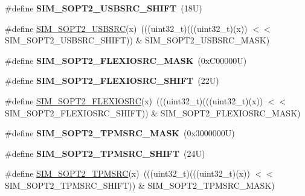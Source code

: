 \begin{DoxyCompactItemize}
\#define {\bfseries S\+I\+M\+\_\+\+S\+O\+P\+T2\+\_\+\+U\+S\+B\+S\+R\+C\+\_\+\+S\+H\+I\+FT}~(18\+U)
\item 
\#define \mbox{\hyperlink{group___s_i_m___register___masks_ga78428c831f0263054ac91c55ed89c016}{S\+I\+M\+\_\+\+S\+O\+P\+T2\+\_\+\+U\+S\+B\+S\+RC}}(x)~(((uint32\+\_\+t)(((uint32\+\_\+t)(x)) $<$$<$ S\+I\+M\+\_\+\+S\+O\+P\+T2\+\_\+\+U\+S\+B\+S\+R\+C\+\_\+\+S\+H\+I\+FT)) \& S\+I\+M\+\_\+\+S\+O\+P\+T2\+\_\+\+U\+S\+B\+S\+R\+C\+\_\+\+M\+A\+SK)
\item 
\mbox{\label{group___s_i_m___register___masks_ga3edd04c495fb49af9ba966854978234a}} 
\#define {\bfseries S\+I\+M\+\_\+\+S\+O\+P\+T2\+\_\+\+F\+L\+E\+X\+I\+O\+S\+R\+C\+\_\+\+M\+A\+SK}~(0x\+C00000\+U)
\item 
\mbox{\label{group___s_i_m___register___masks_ga2969322b1907bf7c3923734bacda7cf6}} 
\#define {\bfseries S\+I\+M\+\_\+\+S\+O\+P\+T2\+\_\+\+F\+L\+E\+X\+I\+O\+S\+R\+C\+\_\+\+S\+H\+I\+FT}~(22\+U)
\item 
\#define \mbox{\hyperlink{group___s_i_m___register___masks_ga4ab3fc6ac8e503f72388a3044914e04e}{S\+I\+M\+\_\+\+S\+O\+P\+T2\+\_\+\+F\+L\+E\+X\+I\+O\+S\+RC}}(x)~(((uint32\+\_\+t)(((uint32\+\_\+t)(x)) $<$$<$ S\+I\+M\+\_\+\+S\+O\+P\+T2\+\_\+\+F\+L\+E\+X\+I\+O\+S\+R\+C\+\_\+\+S\+H\+I\+FT)) \& S\+I\+M\+\_\+\+S\+O\+P\+T2\+\_\+\+F\+L\+E\+X\+I\+O\+S\+R\+C\+\_\+\+M\+A\+SK)
\item 
\mbox{\label{group___s_i_m___register___masks_gab515715932139549d30bb4b6f3e2dc99}} 
\#define {\bfseries S\+I\+M\+\_\+\+S\+O\+P\+T2\+\_\+\+T\+P\+M\+S\+R\+C\+\_\+\+M\+A\+SK}~(0x3000000\+U)
\item 
\mbox{\label{group___s_i_m___register___masks_gac70dc9abda7a707019da3d8fed90a265}} 
\#define {\bfseries S\+I\+M\+\_\+\+S\+O\+P\+T2\+\_\+\+T\+P\+M\+S\+R\+C\+\_\+\+S\+H\+I\+FT}~(24\+U)
\item 
\#define \mbox{\hyperlink{group___s_i_m___register___masks_gae3feae3d7da32c0a46d155fdfdf8d4da}{S\+I\+M\+\_\+\+S\+O\+P\+T2\+\_\+\+T\+P\+M\+S\+RC}}(x)~(((uint32\+\_\+t)(((uint32\+\_\+t)(x)) $<$$<$ S\+I\+M\+\_\+\+S\+O\+P\+T2\+\_\+\+T\+P\+M\+S\+R\+C\+\_\+\+S\+H\+I\+FT)) \& S\+I\+M\+\_\+\+S\+O\+P\+T2\+\_\+\+T\+P\+M\+S\+R\+C\+\_\+\+M\+A\+SK)
\item 
\mbox{\label{group___s_i_m___register___masks_ga759acf1ff86afb0102b845c2df781a91}} 
$$
\end{DoxyCompactItemize}
